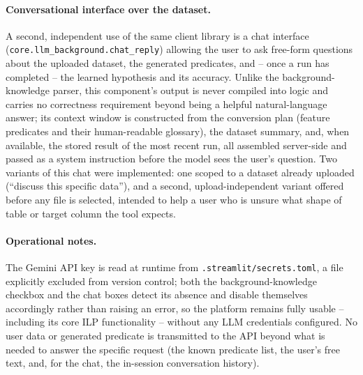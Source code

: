 \paragraph{Conversational interface over the dataset.} A second,
independent use of the same client library is a chat interface
(\texttt{core.llm\_background.chat\_reply}) allowing the user to ask
free-form questions about the uploaded dataset, the generated
predicates, and -- once a run has completed -- the learned hypothesis
and its accuracy. Unlike the background-knowledge parser, this
component's output is never compiled into logic and carries no
correctness requirement beyond being a helpful natural-language
answer; its context window is constructed from the conversion plan
(feature predicates and their human-readable glossary), the dataset
summary, and, when available, the stored result of the most recent
run, all assembled server-side and passed as a system instruction
before the model sees the user's question. Two variants of this
chat were implemented: one scoped to a dataset already uploaded
(``discuss this specific data''), and a second, upload-independent
variant offered before any file is selected, intended to help a user
who is unsure what shape of table or target column the tool expects.

\paragraph{Operational notes.} The Gemini API key is read at runtime
from \texttt{.streamlit/secrets.toml}, a file explicitly excluded from
version control; both the background-knowledge checkbox and the chat
boxes detect its absence and disable themselves accordingly rather
than raising an error, so the platform remains fully usable --
including its core ILP functionality -- without any LLM credentials
configured. No user data or generated predicate is transmitted to the
API beyond what is needed to answer the specific request (the known
predicate list, the user's free text, and, for the chat, the
in-session conversation history).

